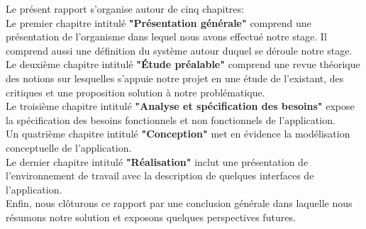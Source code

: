 Le présent rapport s'organise autour de cinq chapitres:\\
Le premier chapitre intitulé {\bf "Présentation générale"} comprend une présentation de l'organisme dans lequel nous avons effectué notre stage. Il comprend aussi une définition du système autour duquel se déroule notre stage. \\
Le deuxième chapitre intitulé {\bf "Étude préalable"} comprend une revue théorique des notions sur lesquelles s’appuie notre projet en une étude de l’existant, des critiques et une proposition solution à notre problématique.\\
Le troisième chapitre intitulé  {\bf "Analyse et spécification des besoins"} expose la spécification des besoins fonctionnels et non fonctionnels de l’application.\\
Un quatrième chapitre intitulé  {\bf "Conception"} met en évidence la modélisation conceptuelle de l’application.\\
Le dernier chapitre intitulé  {\bf "Réalisation"} inclut une présentation de l’environnement de travail avec la description de quelques interfaces de l’application.\\

Enfin, nous clôturons ce rapport par une conclusion générale dans laquelle nous résumons notre solution et exposons quelques perspectives futures.\\